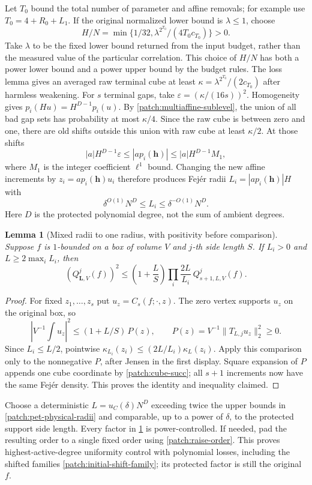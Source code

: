 \documentclass[11pt]{article}
\newtheorem{lemma}[lemma]{Lemma}
\theoremstyle{definition}
\begin{document}
Let $T_0$ bound the total number of parameter and affine removals; for example use
$T_0=4+R_0+L_1$.  If the original normalized lower bound is $\lambda\leq1$, choose
\[
 H/N=\min\{1/32,\lambda^{2^{T_0}}/(4T_0c_{T_0})\}>0.
\]
Take $\lambda$ to be the fixed lower bound returned from the input budget, rather than
the measured value of the particular correlation.  This choice of $H/N$ has both a power
lower bound and a power upper bound by the budget rules.  The loss lemma gives an averaged raw
terminal cube at least $\kappa=\lambda^{2^{T_0}}/(2c_{T_0})$ after harmless weakening.
For $s$ terminal gaps, take $\varepsilon=(\kappa/(16s))^2$.
Homogeneity gives $p_i(Hu)=H^{D-1}p_i(u)$.
By \cref{patch:multiaffine-sublevel}, the union of all bad gap sets has probability at most
$\kappa/4$.  Since the raw cube is between zero and one, there are old shifts outside this
union with raw cube at least $\kappa/2$.  At those shifts
\[
 |a|H^{D-1}\varepsilon\leq |a p_i(\mathbf h)|
       \leq |a|H^{D-1}M_1,
\]
where $M_1$ is the integer coefficient $\ell^1$ bound.
Changing the new affine increments by $z_i=a p_i(\mathbf h)u_i$ therefore produces
Fej\'er radii $L_i=|a p_i(\mathbf h)|H$ with
\begin{equation}\label{patch:pet-physical-radii}
 \delta^{O(1)}N^D\leq L_i\leq\delta^{-O(1)}N^D.
\end{equation}
Here $D$ is the protected polynomial degree, not the sum of ambient degrees.

\begin{lemma}[Mixed radii to one radius, with positivity before comparison]\label{patch:uniformize}
Suppose $f$ is $1$-bounded on a box of volume $V$ and $j$-th side length $S$.
If $L_i>0$ and $L\geq2\max_iL_i$, then
\[
 (Q_{\mathbf L,V}^{j}(f))^2
 \leq\left(1+\frac LS\right)\prod_i\frac{2L}{L_i}\ Q_{s+1,L,V}^{j}(f).
\]
\end{lemma}
\begin{proof}
For fixed $z_1,\ldots,z_s$ put $u_z=C_s(f;\cdot,z)$.
The zero vertex supports $u_z$ on the original box, so
\[
 |V^{-1}\!\int u_z|^2\leq(1+L/S)\,P(z),\qquad
 P(z)=V^{-1}\|T_{L,j}u_z\|_2^2\geq0.
\]
Since $L_i\leq L/2$, pointwise
$\kappa_{L_i}(z_i)\leq(2L/L_i)\kappa_L(z_i)$.
Apply this comparison only to the nonnegative $P$, after Jensen in the first display.
Square expansion of $P$ appends one cube coordinate by \eqref{patch:cube-succ}; all $s+1$
increments now have the same Fej\'er density.  This proves the identity and inequality claimed.
\end{proof}
Choose a deterministic $L=u_C(\delta)N^D$ exceeding twice the upper bounds in
\eqref{patch:pet-physical-radii} and comparable, up to a power of $\delta$, to the protected
support side length.  Every factor in \cref{patch:uniformize} is power-controlled.
If needed, pad the resulting order to a single fixed order using \eqref{patch:raise-order}.
This proves highest-active-degree uniformity control with polynomial losses, including the
shifted families \eqref{patch:initial-shift-family}; its protected factor is still the original $f$.
\end{document}
